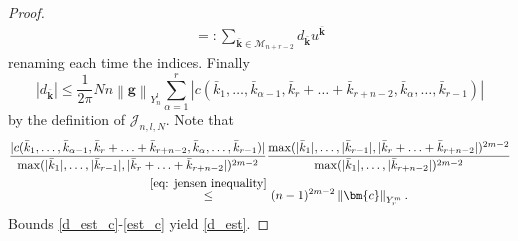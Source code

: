 \documentclass[a4paper,10pt,reqno]{article}
\theoremstyle{definition}
\theoremstyle{plain}
\theoremstyle{plain}
\theoremstyle{definition}
\theoremstyle{plain}
\theoremstyle{plain}
\theoremstyle{plain}
\theoremstyle{definition}
\theoremstyle{definition}
\newcommand{\norm}[1]{\left\lVert #1 \right\rVert}
\def \N{\mathbb N}
\def \Z{\mathbb Z}
\def \M{\mathcal{M}}
\def \J{\mathcal{J}}
\def \k{\bm{k}}
\begin{document}
\begin{proof}
\[\begin{split}
=: \sum_{ \bar{\k} \in \mathcal{M}_{n+r-2} } d_{\bar{\k}} u^{\bar{\k}}
\end{split}
\]
renaming each time the indices. 
Finally 
\begin{equation}\label{d_est_c}
|d_{\bar{\k}}| \le \frac{1}{2\pi} Nn \norm{\bm{g}}_{Y_n^l} \sum_{\alpha = 1}^r | c(\bar{k}_1,\ldots,\bar{k}_{\alpha-1},\bar{k}_r+\ldots+\bar{k}_{r+n-2},\bar{k}_{\alpha},\ldots,\bar{k}_{r-1}) |
\end{equation}
by the definition of $\J_{n,l,N}$. 
Note that 
\begin{equation} \label{est_c}
\begin{split}
\frac{| c(\bar{k}_1,\ldots,\bar{k}_{\alpha-1},\bar{k}_r+\ldots+\bar{k}_{r+n-2},\bar{k}_{\alpha},\ldots,\bar{k}_{r-1}) |}{\max ( |\bar{k}_1|,\ldots,|\bar{k}_{r-1}|,|\bar{k}_r+\ldots+\bar{k}_{r+n-2}| )^{2m-2}} & \frac{\max ( |\bar{k}_1|,\ldots,|\bar{k}_{r-1}|,|\bar{k}_r+\ldots+\bar{k}_{r+n-2}| )^{2m-2}}{\max ( |\bar{k}_1|,\ldots,|\bar{k}_{r+n-2}| )^{2m-2} } \\
\stackrel{\eqref{eq: jensen inequality}}{\le}&\ (n-1)^{2m-2} \norm{\bm{c}}_{Y_r^m}.
\end{split}
\end{equation}
Bounds \eqref{d_est_c}-\eqref{est_c} yield \eqref{d_est}.
\end{proof}


\end{document}
